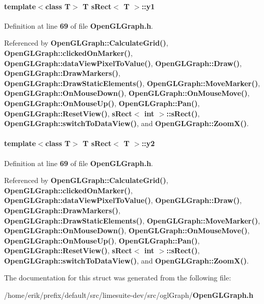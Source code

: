 \paragraph[{y1}]{\setlength{\rightskip}{0pt plus 5cm}template$<$class T$>$ T {\bf s\+Rect}$<$ T $>$\+::y1}\label{structsRect_a591122db2aff58bd98adef371d83b0a7}


Definition at line {\bf 69} of file {\bf Open\+G\+L\+Graph.\+h}.



Referenced by {\bf Open\+G\+L\+Graph\+::\+Calculate\+Grid()}, {\bf Open\+G\+L\+Graph\+::clicked\+On\+Marker()}, {\bf Open\+G\+L\+Graph\+::data\+View\+Pixel\+To\+Value()}, {\bf Open\+G\+L\+Graph\+::\+Draw()}, {\bf Open\+G\+L\+Graph\+::\+Draw\+Markers()}, {\bf Open\+G\+L\+Graph\+::\+Draw\+Static\+Elements()}, {\bf Open\+G\+L\+Graph\+::\+Move\+Marker()}, {\bf Open\+G\+L\+Graph\+::\+On\+Mouse\+Down()}, {\bf Open\+G\+L\+Graph\+::\+On\+Mouse\+Move()}, {\bf Open\+G\+L\+Graph\+::\+On\+Mouse\+Up()}, {\bf Open\+G\+L\+Graph\+::\+Pan()}, {\bf Open\+G\+L\+Graph\+::\+Reset\+View()}, {\bf s\+Rect$<$ int $>$\+::s\+Rect()}, {\bf Open\+G\+L\+Graph\+::switch\+To\+Data\+View()}, and {\bf Open\+G\+L\+Graph\+::\+Zoom\+X()}.

\paragraph[{y2}]{\setlength{\rightskip}{0pt plus 5cm}template$<$class T$>$ T {\bf s\+Rect}$<$ T $>$\+::y2}\label{structsRect_a4af295e07c99b1212403a4197b145d15}


Definition at line {\bf 69} of file {\bf Open\+G\+L\+Graph.\+h}.



Referenced by {\bf Open\+G\+L\+Graph\+::\+Calculate\+Grid()}, {\bf Open\+G\+L\+Graph\+::clicked\+On\+Marker()}, {\bf Open\+G\+L\+Graph\+::data\+View\+Pixel\+To\+Value()}, {\bf Open\+G\+L\+Graph\+::\+Draw()}, {\bf Open\+G\+L\+Graph\+::\+Draw\+Markers()}, {\bf Open\+G\+L\+Graph\+::\+Draw\+Static\+Elements()}, {\bf Open\+G\+L\+Graph\+::\+Move\+Marker()}, {\bf Open\+G\+L\+Graph\+::\+On\+Mouse\+Down()}, {\bf Open\+G\+L\+Graph\+::\+On\+Mouse\+Move()}, {\bf Open\+G\+L\+Graph\+::\+On\+Mouse\+Up()}, {\bf Open\+G\+L\+Graph\+::\+Pan()}, {\bf Open\+G\+L\+Graph\+::\+Reset\+View()}, {\bf s\+Rect$<$ int $>$\+::s\+Rect()}, {\bf Open\+G\+L\+Graph\+::switch\+To\+Data\+View()}, and {\bf Open\+G\+L\+Graph\+::\+Zoom\+X()}.



The documentation for this struct was generated from the following file\+:\begin{DoxyCompactItemize}
\item 
/home/erik/prefix/default/src/limesuite-\/dev/src/ogl\+Graph/{\bf Open\+G\+L\+Graph.\+h}\end{DoxyCompactItemize}
